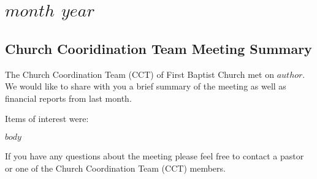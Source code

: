 \documentclass[Letter, 11pt, twoside]{report}
\begin{document}
\part{$month$ $year$}
\chapter{Church Cooridination Team Meeting Summary}

The Church Coordination Team (CCT) of First Baptist Church met on $author$. We would like to share with you a brief summary of the meeting as well as financial reports from last month.

Items of interest were:

$body$

If you have any questions about the meeting please feel free to contact a pastor or one of the Church Coordination Team (CCT) members.
\end{document}
